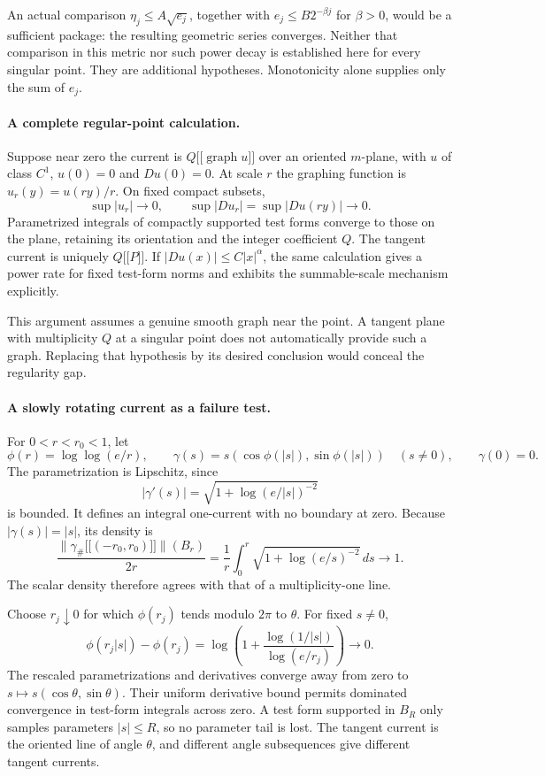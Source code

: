 \documentclass[11pt]{article}
\begin{document}
An actual comparison $\eta_j\leq A\sqrt{e_j}$, together
with $e_j\leq B2^{-\beta j}$ for $\beta>0$, would be a
sufficient package: the resulting geometric series converges.
Neither that comparison in this metric nor such power
decay is established here for every singular point.
They are additional hypotheses. Monotonicity alone
supplies only the sum of $e_j$.

\paragraph{A complete regular-point calculation.}
Suppose near zero the current is
$Q\lbrack\!\lbrack\operatorname{graph}u\rbrack\!\rbrack$ over an oriented
$m$-plane, with $u$ of class $C^1$, $u(0)=0$ and $Du(0)=0$.
At scale $r$ the graphing function is $u_r(y)=u(ry)/r$.
On fixed compact subsets,
\[
 \sup|u_r|\longrightarrow0,\qquad
 \sup|Du_r|=\sup|Du(ry)|\longrightarrow0.
\]
Parametrized integrals of compactly supported test forms
converge to those on the plane, retaining its orientation
and the integer coefficient $Q$. The tangent current
is uniquely $Q\lbrack\!\lbrack P\rbrack\!\rbrack$. If
$|Du(x)|\leq C|x|^\alpha$, the same calculation gives
a power rate for fixed test-form norms and exhibits
the summable-scale mechanism explicitly.

This argument assumes a genuine smooth graph near
the point. A tangent plane with multiplicity $Q$
at a singular point does not automatically provide
such a graph. Replacing that hypothesis by its
desired conclusion would conceal the regularity gap.

\paragraph{A slowly rotating current as a failure test.}
For $0<r<r_0<1$, let
\[
 \phi(r)=\log\log(e/r),\qquad
 \gamma(s)=s(\cos\phi(|s|),\sin\phi(|s|))
 \quad(s\ne0),\qquad\gamma(0)=0.
\]
The parametrization is Lipschitz, since
\[
 |\gamma'(s)|=\sqrt{1+\log(e/|s|)^{-2}}
\]
is bounded. It defines an integral one-current with no
boundary at zero. Because $|\gamma(s)|=|s|$, its density is
\[
 \frac{\|\gamma_\#\lbrack\!\lbrack(-r_0,r_0)\rbrack\!\rbrack\|(B_r)}{2r}
 =\frac1r\int_0^r\sqrt{1+\log(e/s)^{-2}}\,ds
                                      \longrightarrow1.
\]
The scalar density therefore agrees with that of a
multiplicity-one line.

Choose $r_j\downarrow0$ for which $\phi(r_j)$ tends
modulo $2\pi$ to $\theta$. For fixed $s\ne0$,
\[
 \phi(r_j|s|)-\phi(r_j)
 =\log\left(1+\frac{\log(1/|s|)}{\log(e/r_j)}\right)
                                      \longrightarrow0.
\]
The rescaled parametrizations and derivatives converge
away from zero to $s\mapsto s(\cos\theta,\sin\theta)$.
Their uniform derivative bound permits dominated
convergence in test-form integrals across zero.
A test form supported in $B_R$ only samples
parameters $|s|\leq R$, so no parameter tail is
lost. The tangent current is the oriented line
of angle $\theta$, and different angle subsequences
give different tangent currents.
\end{document}
